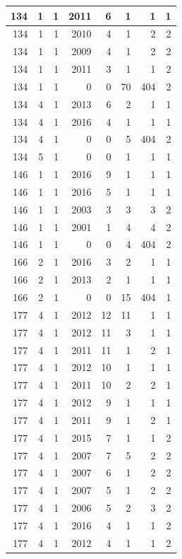 \documentclass[11pt,]{book}
\begin{document}
\begin{table}
\begin{tabular}[t]{r|r|r|r|r|r|r|r}
\hline
134 & 1 & 1 & 2011 & 6 & 1 & 1 & 1\\
\hline
134 & 1 & 1 & 2010 & 4 & 1 & 2 & 2\\
\hline
134 & 1 & 1 & 2009 & 4 & 1 & 2 & 2\\
\hline
134 & 1 & 1 & 2011 & 3 & 1 & 1 & 2\\
\hline
134 & 1 & 1 & 0 & 0 & 70 & 404 & 2\\
\hline
134 & 4 & 1 & 2013 & 6 & 2 & 1 & 1\\
\hline
134 & 4 & 1 & 2016 & 4 & 1 & 1 & 1\\
\hline
134 & 4 & 1 & 0 & 0 & 5 & 404 & 2\\
\hline
134 & 5 & 1 & 0 & 0 & 1 & 1 & 1\\
\hline
146 & 1 & 1 & 2016 & 9 & 1 & 1 & 1\\
\hline
146 & 1 & 1 & 2016 & 5 & 1 & 1 & 1\\
\hline
146 & 1 & 1 & 2003 & 3 & 3 & 3 & 2\\
\hline
146 & 1 & 1 & 2001 & 1 & 4 & 4 & 2\\
\hline
146 & 1 & 1 & 0 & 0 & 4 & 404 & 2\\
\hline
166 & 2 & 1 & 2016 & 3 & 2 & 1 & 1\\
\hline
166 & 2 & 1 & 2013 & 2 & 1 & 1 & 1\\
\hline
166 & 2 & 1 & 0 & 0 & 15 & 404 & 1\\
\hline
177 & 4 & 1 & 2012 & 12 & 11 & 1 & 1\\
\hline
177 & 4 & 1 & 2012 & 11 & 3 & 1 & 1\\
\hline
177 & 4 & 1 & 2011 & 11 & 1 & 2 & 1\\
\hline
177 & 4 & 1 & 2012 & 10 & 1 & 1 & 1\\
\hline
177 & 4 & 1 & 2011 & 10 & 2 & 2 & 1\\
\hline
177 & 4 & 1 & 2012 & 9 & 1 & 1 & 1\\
\hline
177 & 4 & 1 & 2011 & 9 & 1 & 2 & 1\\
\hline
177 & 4 & 1 & 2015 & 7 & 1 & 1 & 2\\
\hline
177 & 4 & 1 & 2007 & 7 & 5 & 2 & 2\\
\hline
177 & 4 & 1 & 2007 & 6 & 1 & 2 & 2\\
\hline
177 & 4 & 1 & 2007 & 5 & 1 & 2 & 2\\
\hline
177 & 4 & 1 & 2006 & 5 & 2 & 3 & 2\\
\hline
177 & 4 & 1 & 2016 & 4 & 1 & 1 & 2\\
\hline
177 & 4 & 1 & 2012 & 4 & 1 & 1 & 2\\

\end{tabular}
\end{table}
\end{document}
